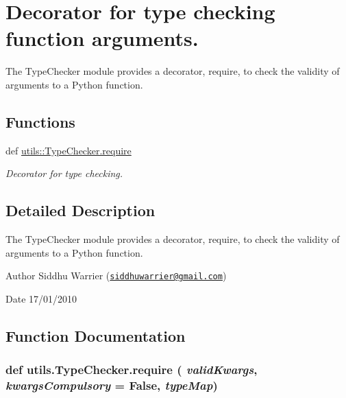 \hypertarget{group__TypeChecker}{
\section{Decorator for type checking function arguments.}
\label{group__TypeChecker}
}


The TypeChecker module provides a decorator, require, to check the validity of arguments to a Python function.  
\subsection*{Functions}
\begin{DoxyCompactItemize}
\item 
def \hyperlink{group__TypeChecker_ga733bd113d0f063a4522c00a798198111}{utils::TypeChecker.require}
\begin{DoxyCompactList}\small\item\em Decorator for type checking. \item\end{DoxyCompactList}\end{DoxyCompactItemize}


\subsection{Detailed Description}
The TypeChecker module provides a decorator, require, to check the validity of arguments to a Python function. \begin{DoxyAuthor}{Author}
Siddhu Warrier (\href{mailto:siddhuwarrier@gmail.com}{\tt siddhuwarrier@gmail.com}) 
\end{DoxyAuthor}
\begin{DoxyDate}{Date}
17/01/2010 
\end{DoxyDate}


\subsection{Function Documentation}
\hypertarget{group__TypeChecker_ga733bd113d0f063a4522c00a798198111}{
\subsubsection[{require}]{\setlength{\rightskip}{0pt plus 5cm}def utils.TypeChecker.require ( {\em validKwargs}, \/   {\em kwargsCompulsory} = {\ttfamily False}, \/   {\em typeMap})}}
\label{group__TypeChecker_ga733bd113d0f063a4522c00a798198111}


